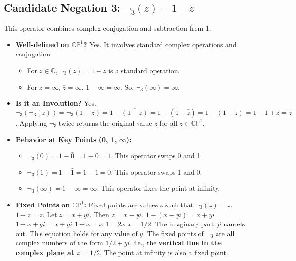 \documentclass{article}
\begin{document}
	\subsection{Candidate Negation 3: $\neg_3(z) = 1 - \bar{z}$}
	
	This operator combines complex conjugation and subtraction from 1.
	
	\begin{itemize}
		\item \textbf{Well-defined on $\mathbb{CP}^1$?} Yes. It involves standard complex operations and conjugation.
		\begin{itemize}
			\item For $z \in \mathbb{C}$, $\neg_3(z) = 1 - \bar{z}$ is a standard operation.
			\item For $z = \infty$, $\bar{z} = \infty$. $1 - \infty = \infty$. So, $\neg_3(\infty) = \infty$.
		\end{itemize}
		
		\item \textbf{Is it an Involution?} Yes.
		$\neg_3(\neg_3(z)) = \neg_3(1 - \bar{z}) = 1 - \overline{(1 - \bar{z})} = 1 - (\bar{1} - \bar{\bar{z}}) = 1 - (1 - z) = 1 - 1 + z = z$.
		Applying $\neg_3$ twice returns the original value $z$ for all $z \in \mathbb{CP}^1$.
		
		\item \textbf{Behavior at Key Points (0, 1, $\infty$):}
		\begin{itemize}
			\item $\neg_3(0) = 1 - \bar{0} = 1 - 0 = 1$. This operator swaps 0 and 1.
			\item $\neg_3(1) = 1 - \bar{1} = 1 - 1 = 0$. This operator swaps 1 and 0.
			\item $\neg_3(\infty) = 1 - \bar{\infty} = \infty$. This operator fixes the point at infinity.
		\end{itemize}
		
		\item \textbf{Fixed Points on $\mathbb{CP}^1$:} Fixed points are values $z$ such that $\neg_3(z) = z$.
		$1 - \bar{z} = z$.
		Let $z = x + yi$. Then $\bar{z} = x - yi$.
		$1 - (x - yi) = x + yi$
		$1 - x + yi = x + yi$
		$1 - x = x$
		$1 = 2x$
		$x = 1/2$.
		The imaginary part $yi$ cancels out. This equation holds for any value of $y$.
		The fixed points of $\neg_3$ are all complex numbers of the form $1/2 + yi$, i.e., the \textbf{vertical line in the complex plane at $x = 1/2$}. The point at infinity is also a fixed point.
		

\end{itemize}
\end{document}

